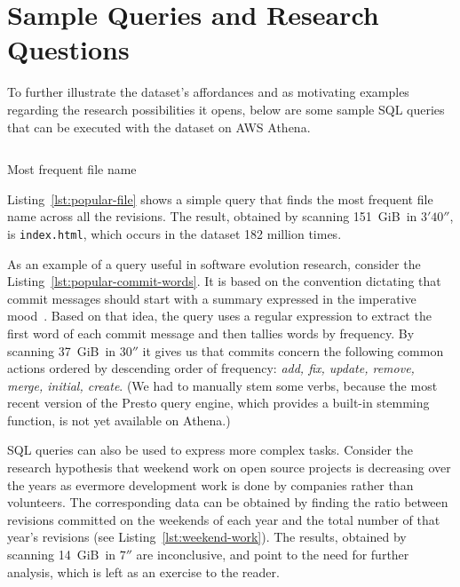 \section{Sample Queries and Research Questions}
\label{sec:usage}
To further illustrate the dataset's affordances and as
motivating examples regarding the research possibilities
it opens,
below are some sample SQL queries that can be executed
with the dataset on \textsc{AWS} Athena.

\begin{listing}[H]
    \inputminted[firstline=4]{sql}{codesamples/graph-dataset/popular-file.sql}
    \caption{Most frequent file name}%
    \label{lst:popular-file}
\end{listing}

Listing~\ref{lst:popular-file} shows a simple query
that finds the most frequent file name across all the revisions.
The result, obtained by scanning
151~GiB\ in $3'40''$, is \texttt{index.html}, which occurs in the dataset 182
million times.



As an example of a query useful in software evolution research,
consider the Listing~\ref{lst:popular-commit-words}.
It is based on the convention dictating that commit messages should
start with a summary expressed in the imperative mood~\cite[3.3.2.1]{Fre19}.
Based on that idea, the query uses a regular expression to extract the first
word of each commit message and then tallies words by frequency.
By scanning 37~GiB\ in $30''$ it gives us that commits
concern the following common actions ordered by descending order of frequency:
\emph{add, fix, update, remove, merge, initial, create}.
(We had to manually stem some verbs,
because the most recent version of the Presto query engine,
which provides a built-in stemming function,
is not yet available on Athena.)



SQL queries can also be used to express more complex tasks.
Consider the research hypothesis that weekend work on open source projects
is decreasing over the years as evermore
development work is done by companies rather than volunteers.
The corresponding data can be obtained by finding the ratio
between revisions committed on the weekends of each year and
the total number of that year's revisions (see Listing~\ref{lst:weekend-work}).
The results, obtained by scanning 14~GiB\ in $7''$ are inconclusive,
and point to the need for further analysis,
which is left as an exercise to the reader.

